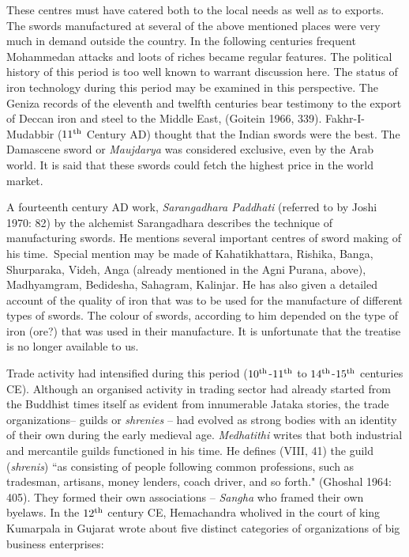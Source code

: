 These centres must have catered both to the local needs as well as to exports. The swords manufactured at several of the above mentioned places were very much in demand outside the country. In the following centuries frequent Mohammedan attacks and loots of riches became regular features. The political history of this period is too well known to warrant discussion here. The status of iron technology during this period may be examined in this perspective. The Geniza records of the eleventh and twelfth centuries bear testimony to the export of Deccan iron and steel to the Middle East, (Goitein 1966, 339). Fakhr-I-Mudabbir ($11^{\rm th}$ Century AD) thought that the Indian swords were the best. The Damascene sword or {\it Maujdarya} was considered exclusive, even by the Arab world. It is said that these swords could fetch the highest price in the world market. 

A fourteenth century AD work, {\it Sarangadhara Paddhati} (referred to by Joshi 1970: 82) by the alchemist Sarangadhara describes the technique of manufacturing swords. He mentions several important centres of sword making of his time.~Special mention may be made of Kahatikhattara, Rishika, Banga, Shurparaka, Videh, Anga (already mentioned in the Agni Purana, above), Madhyamgram, Bedidesha, Sahagram, Kalinjar. He has also given a detailed account of the quality of iron that was to be used for the manufacture of different types of swords. The colour of swords, according to him depended on the type of iron (ore?) that was used in their manufacture. It is unfortunate that the treatise is no longer available to us. 

Trade activity had intensified during this period ($10^{\rm th}$-$11^{\rm th}$ to $14^{\rm th}$-$15^{\rm th}$ centuries CE). Although an organised activity in trading sector had already started from the Buddhist times itself as evident from innumerable Jataka stories, the trade organizations– guilds or {\it shrenies} – had evolved as strong bodies with an identity of their own during the early medieval age. {\it Medhatithi} writes that both industrial and mercantile guilds functioned in his time. He defines (VIII, 41) the guild ({\it shrenis}) ``as consisting of people following common professions, such as tradesman, artisans, money lenders, coach driver, and so forth." (Ghoshal 1964: 405). They formed their own associations – {\it Sangha} who framed their own byelaws. In the $12^{\rm th}$ century CE, Hemachandra who\newpage lived in the court of king Kumarpala in Gujarat wrote about five distinct categories of organizations of big business enterprises:

